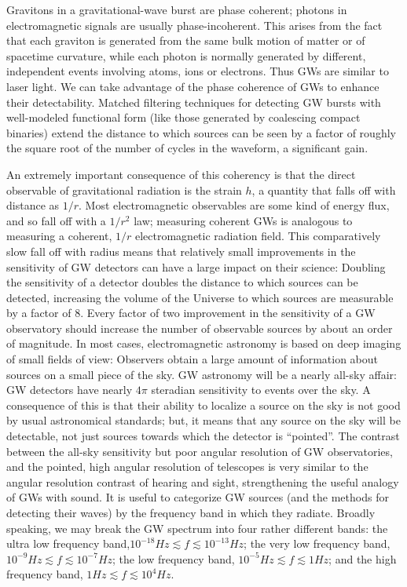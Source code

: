 \documentclass[binding=0.6cm, LaM]{sapthesis}
\begin{document}
Gravitons in a gravitational-wave burst are phase coherent; photons in electromagnetic signals are usually phase-incoherent. This arises from the fact that each graviton is generated from the same bulk motion of matter or of spacetime curvature, while each photon is normally generated by different, independent events involving atoms, ions or electrons. Thus GWs are similar to laser light. We can take advantage of the phase coherence of GWs to enhance their detectability. Matched filtering techniques for detecting GW bursts with well-modeled functional form (like those generated by coalescing compact binaries) extend the distance to which sources can be seen by a factor of roughly the square root of the number of cycles in the waveform, a significant gain.

An extremely important consequence of this coherency is that the direct observable of gravitational radiation is the strain $h$, a quantity that falls off with distance as $1/r$. Most electromagnetic observables are some kind of energy flux, and so fall off with a $1/r^2$ law; measuring coherent GWs is analogous to measuring a coherent, $1/r$ 
electromagnetic radiation field. This comparatively slow fall off with radius means that relatively small improvements in the sensitivity of GW detectors can have a large impact on their science: Doubling the sensitivity of a detector doubles the distance to which sources can be detected, increasing the volume of the Universe to which sources are measurable by a factor of 8. Every factor of two improvement in the sensitivity of a GW observatory should increase the number of observable sources by about an order of magnitude. 
In most cases, electromagnetic astronomy is based on deep imaging of small fields of view: Observers obtain a large amount of information about sources on a small piece of the sky. GW astronomy will be a nearly all-sky affair: GW detectors have nearly $4\pi$ steradian sensitivity to events over the sky. A consequence of this is that their ability to localize a source on the sky is not good by usual astronomical standards; but, it means that any source on the sky will be detectable, not just sources towards which the detector is “pointed”. The contrast between the all-sky sensitivity but poor angular resolution of GW observatories, and the pointed, high angular resolution of telescopes is very similar to the angular resolution contrast of hearing and sight, strengthening the useful analogy of GWs with sound. 
It is useful to categorize GW sources (and the methods for detecting their waves) by the frequency band in which they radiate. Broadly speaking, we may break the GW spectrum into four rather different bands: the ultra low frequency band,$10^{-18}Hz \apprle f \apprle 10^{-13} Hz$; the very low frequency band, $10^{−9} Hz \apprle f \apprle 10^{−7} Hz$; the low frequency band, $10^{−5} Hz \apprle f \apprle 1Hz$; and the high frequency band, $1Hz \apprle f \apprle 10^4 Hz$.
\end{document}
